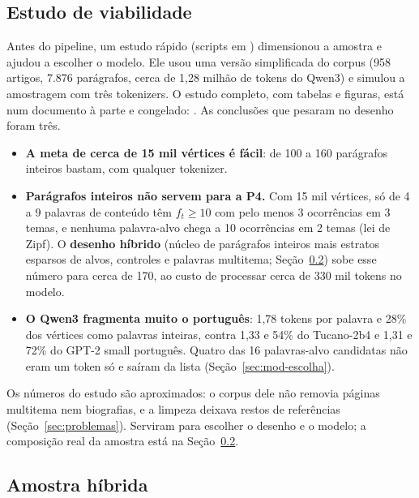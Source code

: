 \subsection{Estudo de viabilidade}\label{sec:viabilidade}

Antes do pipeline, um estudo rápido (scripts em ) dimensionou a
amostra e ajudou a escolher o modelo. Ele usou uma versão simplificada do corpus (958 artigos,
7.876 parágrafos, cerca de 1,28 milhão de tokens do Qwen3) e simulou a amostragem com três
tokenizers. O estudo completo, com tabelas e figuras, está num documento à parte e congelado:
\href{https://github.com/annwith/gender-representation-networks/blob/main/report/estudo-de-viabilidade/estudo-de-viabilidade.pdf}{}.
As conclusões que pesaram no desenho foram três.
\begin{itemize}
    \item \textbf{A meta de cerca de 15 mil vértices é fácil}: de 100 a 160 parágrafos
    inteiros bastam, com qualquer tokenizer.
    \item \textbf{Parágrafos inteiros não servem para a P4.} Com 15 mil vértices, só de 4 a 9
    palavras de conteúdo têm $f_t\ge10$ com pelo menos 3 ocorrências em 3 temas, e nenhuma
    palavra-alvo chega a 10 ocorrências em 2 temas (lei de Zipf). O \textbf{desenho híbrido}
    (núcleo de parágrafos inteiros mais estratos esparsos de alvos, controles e palavras
    multitema; Seção~\ref{sec:amostra}) sobe esse número para cerca de 170, ao custo de
    processar cerca de 330 mil tokens no modelo.
    \item \textbf{O Qwen3 fragmenta muito o português}: 1,78 tokens por palavra e 28\% dos
    vértices como palavras inteiras, contra 1,33 e 54\% do Tucano-2b4 e 1,31 e 72\% do GPT-2
    small português. Quatro das 16 palavras-alvo candidatas não eram um token só e saíram da
    lista (Seção~\ref{sec:mod-escolha}).
\end{itemize}
Os números do estudo são aproximados: o corpus dele não removia páginas multitema nem
biografias, e a limpeza deixava restos de referências (Seção~\ref{sec:problemas}). Serviram
para escolher o desenho e o modelo; a composição real da amostra está na
Seção~\ref{sec:amostra}.

\subsection{Amostra híbrida}\label{sec:amostra}

